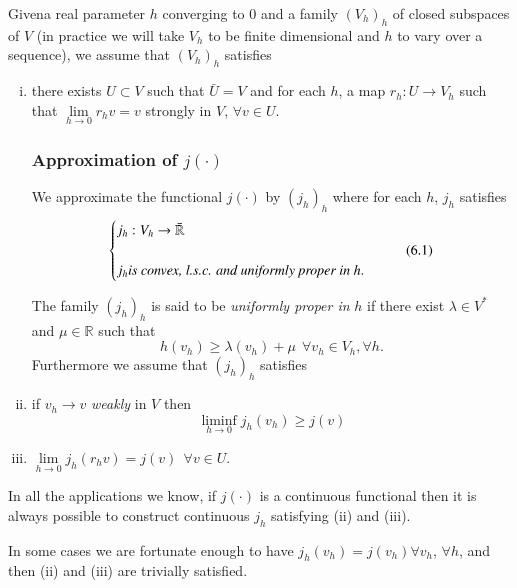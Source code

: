 Given\pageoriginale a real parameter $h$ converging to 0 and a family
$(V_h)_h$ of 
closed subspaces of $V$ (in practice we will take $V_h$ to be finite
dimensional and $h$ to vary over a sequence), we assume that $(V_h)_h$
satisfies 
\begin{enumerate}[(i)]
\item there exists $U \subset V$ such that $\bar{U} = V$ and for each
  $h$, a map $r_h : U \to V_h$ such that $\lim \limits_{h \to 0}r_h v
  = v$ strongly in $V$, $\forall v \in U$. 

\subsubsection{Approximation of
  $j(\cdot)$}\label{c1:sss6.2.2}%

We approximate the functional $j(\cdot)$ by $(j_h)_h$ where for each
$h$, $j_h$ satisfies 
\begin{equation}
\begin{cases}
j_h : V_h \to \bar{\mathbb{R}}\\
& \tag{6.1}\\
j_h \text{\em is convex, l.s.c. and uniformly proper in }h.
\end{cases}
\end{equation}


The family $(j_h)_h$ is said to be \textit{uniformly proper in} $h$ if
there exist $\lambda \in V^*$ and $\mu \in \mathbb{R}$ such
that  
\begin{equation*}
h(v_h) \geq \lambda (v_h) + \mu ~~ \forall v_h \in V_h, \forall
h. \tag{6.2}\label{c1:eq6.2}
\end{equation*}
Furthermore we assume that $(j_h)_h$ satisfies
\item if $v_h \to v$ \textit{weakly} in $V$ then 
$$
\mathop{\lim\inf}_{h \to 0} j_h(v_h) \geq j(v)
$$
\item $\lim \limits_{h \to 0} j_h(r_h v) = j(v) ~~ \forall v \in U$.
\end{enumerate}

\begin{remark}\label{c1:rem6.1}%
In all the applications we know, if $j(\cdot)$ is a continuous
functional then it is always possible to construct continuous $j_h$
satisfying (ii) and (iii). 
\end{remark}

\begin{remark}\label{c1:rem6.2}%
In some cases we are fortunate enough to have $j_h(v_h) = j(v_h)
\forall v_h$, $\forall h$, and then (ii) and (iii) are trivially
satisfied. 
\end{remark}

